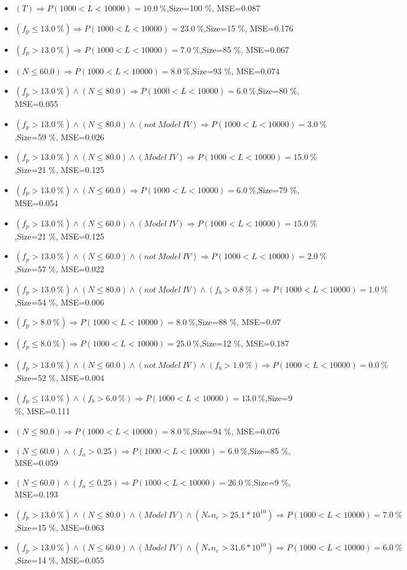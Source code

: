 \documentclass[numbered]{CSL}
\begin{document}
\begin{itemize}
\item $(T) \Rightarrow P(1 000 < L < 10 000) = 10.0~\%$,\hfill Size=100 \%, MSE=0.087
\item $(f_p \leq 13.0~\%) \Rightarrow P(1 000 < L < 10 000) = 23.0~\%$,\hfill Size=15 \%, MSE=0.176
\item $(f_p > 13.0~\%) \Rightarrow P(1 000 < L < 10 000) = 7.0~\%$,\hfill Size=85 \%, MSE=0.067
\item $(N \leq 60.0) \Rightarrow P(1 000 < L < 10 000) = 8.0~\%$,\hfill Size=93 \%, MSE=0.074
\item $(f_p > 13.0~\%) \land (N \leq 80.0) \Rightarrow P(1 000 < L < 10 000) = 6.0~\%$,\hfill Size=80 \%, MSE=0.055
\item $(f_p > 13.0~\%) \land (N \leq 80.0) \land (not~Model~IV) \Rightarrow P(1 000 < L < 10 000) = 3.0~\%$,\hfill Size=59 \%, MSE=0.026
\item $(f_p > 13.0~\%) \land (N \leq 80.0) \land (Model~IV) \Rightarrow P(1 000 < L < 10 000) = 15.0~\%$,\hfill Size=21 \%, MSE=0.125
\item $(f_p > 13.0~\%) \land (N \leq 60.0) \Rightarrow P(1 000 < L < 10 000) = 6.0~\%$,\hfill Size=79 \%, MSE=0.054
\item $(f_p > 13.0~\%) \land (N \leq 60.0) \land (Model~IV) \Rightarrow P(1 000 < L < 10 000) = 15.0~\%$,\hfill Size=21 \%, MSE=0.125
\item $(f_p > 13.0~\%) \land (N \leq 60.0) \land (not~Model~IV) \Rightarrow P(1 000 < L < 10 000) = 2.0~\%$,\hfill Size=57 \%, MSE=0.022
\item $(f_p > 13.0~\%) \land (N \leq 80.0) \land (not~Model~IV) \land (f_b > 0.8~\%) \Rightarrow P(1 000 < L < 10 000) = 1.0~\%$,\hfill Size=54 \%, MSE=0.006
\item $(f_p > 8.0~\%) \Rightarrow P(1 000 < L < 10 000) = 8.0~\%$,\hfill Size=88 \%, MSE=0.07
\item $(f_p \leq 8.0~\%) \Rightarrow P(1 000 < L < 10 000) = 25.0~\%$,\hfill Size=12 \%, MSE=0.187
\item $(f_p > 13.0~\%) \land (N \leq 60.0) \land (not~Model~IV) \land (f_b > 1.0~\%) \Rightarrow P(1 000 < L < 10 000) = 0.0~\%$,\hfill Size=52 \%, MSE=0.004
\item $(f_p \leq 13.0~\%) \land (f_b > 6.0~\%) \Rightarrow P(1 000 < L < 10 000) = 13.0~\%$,\hfill Size=9 \%, MSE=0.111
\item $(N \leq 80.0) \Rightarrow P(1 000 < L < 10 000) = 8.0~\%$,\hfill Size=94 \%, MSE=0.076
\item $(N \leq 60.0) \land (f_a > 0.25) \Rightarrow P(1 000 < L < 10 000) = 6.0~\%$,\hfill Size=85 \%, MSE=0.059
\item $(N \leq 60.0) \land (f_a \leq 0.25) \Rightarrow P(1 000 < L < 10 000) = 26.0~\%$,\hfill Size=9 \%, MSE=0.193
\item $(f_p > 13.0~\%) \land (N \leq 80.0) \land (Model~IV) \land (N_* n_e > 25.1 * 10^{10}) \Rightarrow P(1 000 < L < 10 000) = 7.0~\%$,\hfill Size=15 \%, MSE=0.063
\item $(f_p > 13.0~\%) \land (N \leq 60.0) \land (Model~IV) \land (N_* n_e > 31.6 * 10^{10}) \Rightarrow P(1 000 < L < 10 000) = 6.0~\%$,\hfill Size=14 \%, MSE=0.055
\end{itemize}
\end{document}
